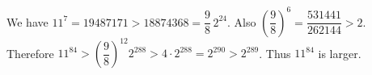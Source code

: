 We have $11^7=19487171>18874368=\dfrac{9}{8}\,2^{24}$. Also $(\dfrac{9}{8})^6=\dfrac{531441}{262144}>2$. Therefore $11^{84}>(\dfrac{9}{8})^{12}2^{288}>4\cdot2^{288}=2^{290}>2^{289}$. Thus $\boxed{11^{84}}$ is larger.
